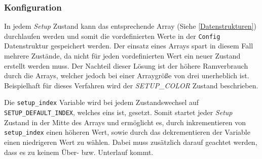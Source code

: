     \subsubsection{Konfiguration}
        In jedem \textit{Setup} Zustand kann das entsprechende Array
        (Siehe \ref{Datenstrukturen}) durchlaufen werden und somit die
        vordefinierten Werte in der \texttt{Config} Datenstruktur gespeichert
        werden. Der einsatz eines Arrays spart in diesem Fall mehrere Zustände,
        da nicht für jeden vordefinierten Wert ein neuer Zustand erstellt werden
        muss. Der Nachteil dieser Lösung ist der höhere Ramverbrauch durch die
        Arrays, welcher jedoch bei einer Arraygröße von drei unerheblich ist.
        Beispielhaft für dieses Verfahren wird der \textit{SETUP\_COLOR} Zustand
        beschrieben.
        
        Die \texttt{setup\_index} Variable wird bei jedem Zustandswechsel auf
        \texttt{SETUP\_DEFAULT\_INDEX}, welches eins ist, gesetzt. Somit
        startet jeder \textit{Setup} Zustand in der Mitte des Arrays und
        ermöglicht es, durch inkrementieren von \texttt{setup\_index} einen
        höheren Wert, sowie durch das dekrementieren der Variable einen
        niedrigeren Wert zu wählen. Dabei muss zusätzlich darauf geachtet werden,
        dass es zu keinem Über- bzw. Unterlauf kommt.


